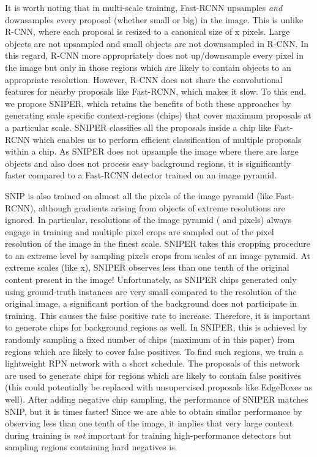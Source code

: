\documentclass{article}
\begin{document}
It is worth noting that in multi-scale training, Fast-RCNN upsamples {\em and} downsamples every proposal (whether small or big) in the image. This is unlike R-CNN, where each proposal is resized to a canonical size of x pixels. Large objects are not upsampled and small objects are not downsampled in R-CNN. In this regard, R-CNN more appropriately does not up/downsample every pixel in the image but only in those regions which are likely to contain objects to an appropriate resolution. However, R-CNN does not share the convolutional features for nearby proposals like Fast-RCNN, which makes it slow. To this end, we propose  SNIPER, which retains the benefits of both these approaches by generating scale specific context-regions (chips) that cover maximum proposals at a particular scale. SNIPER classifies all the proposals inside a chip like Fast-RCNN which enables us to perform efficient classification of multiple proposals within a chip. As SNIPER does not upsample the image where there are large objects and also does not process easy background regions, it is significantly faster compared to a Fast-RCNN detector trained on an image pyramid. 




SNIP \cite{singh2017analysis} is also trained on almost all the pixels of the image pyramid (like Fast-RCNN), although gradients arising from objects of extreme resolutions are ignored. In particular,  resolutions of the image pyramid ( and  pixels) always engage in training and multiple  pixel crops are sampled out of the  pixel resolution of the image in the finest scale. SNIPER takes this cropping procedure to an extreme level by sampling  pixels crops from  scales of an image pyramid. At extreme scales (like x), SNIPER observes less than one tenth of the original content present in the image! Unfortunately, as SNIPER chips generated only using ground-truth instances are very small compared to the resolution of the original image, a significant portion of the background does not participate in training. This causes the false positive rate to increase. Therefore, it is important to generate chips for background regions as well. In SNIPER, this is achieved by randomly sampling a fixed number of chips (maximum of  in this paper) from regions which are likely to cover false positives. To find such regions, we train a lightweight RPN network with a short schedule. The proposals of this network are used to generate chips for regions which are likely to contain false positives (this could potentially be replaced with unsupervised proposals like EdgeBoxes \cite{zitnick2014edge} as well). After adding negative chip sampling, the performance of SNIPER matches SNIP, but it is  times faster! Since we are able to obtain similar performance by observing less than one tenth of the image, it implies that very large context during training is {\em not} important for training high-performance detectors but sampling regions containing hard negatives is. 
\end{document}
